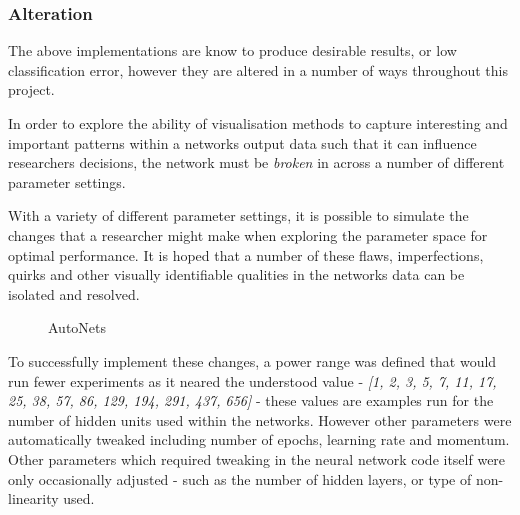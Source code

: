 \documentclass[a4paper,11pt,titlepage]{article}
\begin{document}
		\subsubsection{Alteration}
		The above implementations are know to produce desirable results, or low classification error, however they are altered in a number of ways throughout this project. 
		\par 
		In order to explore the ability of visualisation methods to capture interesting and important patterns within a networks output data such that it can influence researchers decisions, the network must be \textit{broken} in across a number of different parameter settings.
		\par 
		With a variety of different parameter settings, it is possible to simulate the changes that a researcher might make when exploring the parameter space for optimal performance. It is hoped that a number of these flaws, imperfections, quirks and other visually identifiable qualities in the networks data can be isolated and resolved.
		
	\begin{figure}[H]
    			\caption{AutoNets}%
	\end{figure}	
	
		\par 
		To successfully implement these changes, a power range was defined that would run fewer experiments as it neared the understood value - \textit{[1, 2, 3, 5, 7, 11, 17, 25, 38, 57, 86, 129, 194, 291, 437, 656]} - these values are examples run for the number of hidden units used within the networks. However other parameters were automatically tweaked including number of epochs, learning rate and momentum. Other parameters which required tweaking in the neural network code itself were only occasionally adjusted - such as the number of hidden layers, or type of non-linearity used.
		
\end{document}
